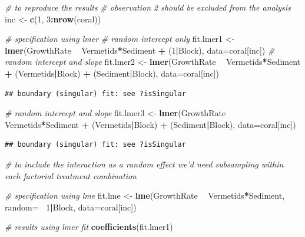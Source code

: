 \documentclass[]{book}
\newenvironment{Shaded}{\begin{snugshade}}{\end{snugshade}}
\newcommand{\KeywordTok}[1]{\textcolor[rgb]{0.13,0.29,0.53}{\textbf{#1}}}
\newcommand{\DataTypeTok}[1]{\textcolor[rgb]{0.13,0.29,0.53}{#1}}
\newcommand{\DecValTok}[1]{\textcolor[rgb]{0.00,0.00,0.81}{#1}}
\newcommand{\StringTok}[1]{\textcolor[rgb]{0.31,0.60,0.02}{#1}}
\newcommand{\CommentTok}[1]{\textcolor[rgb]{0.56,0.35,0.01}{\textit{#1}}}
\newcommand{\OperatorTok}[1]{\textcolor[rgb]{0.81,0.36,0.00}{\textbf{#1}}}
\newcommand{\NormalTok}[1]{#1}
\begin{document}
\begin{Shaded}
\begin{Highlighting}[]
\CommentTok{# to reproduce the results}
\CommentTok{# observation 2 should be excluded from the analysis}
\NormalTok{inc <-}\StringTok{ }\KeywordTok{c}\NormalTok{(}\DecValTok{1}\NormalTok{, }\DecValTok{3}\OperatorTok{:}\KeywordTok{nrow}\NormalTok{(coral))}

\CommentTok{# specification using lmer}
\CommentTok{# random intercept only}
\NormalTok{fit.lmer1 <-}\StringTok{ }\KeywordTok{lmer}\NormalTok{(GrowthRate }\OperatorTok{~}\StringTok{ }\NormalTok{Vermetids}\OperatorTok{*}\NormalTok{Sediment }\OperatorTok{+}\StringTok{ }\NormalTok{(}\DecValTok{1}\OperatorTok{|}\NormalTok{Block), }\DataTypeTok{data=}\NormalTok{coral[inc])}
\CommentTok{# random intercept and slope}
\NormalTok{fit.lmer2 <-}\StringTok{ }\KeywordTok{lmer}\NormalTok{(GrowthRate }\OperatorTok{~}\StringTok{ }\NormalTok{Vermetids}\OperatorTok{*}\NormalTok{Sediment }\OperatorTok{+}\StringTok{ }\NormalTok{(Vermetids}\OperatorTok{|}\NormalTok{Block) }\OperatorTok{+}\StringTok{ }\NormalTok{(Sediment}\OperatorTok{|}\NormalTok{Block), }\DataTypeTok{data=}\NormalTok{coral[inc])}
\end{Highlighting}
\end{Shaded}

\begin{verbatim}
## boundary (singular) fit: see ?isSingular
\end{verbatim}

\begin{Shaded}
\begin{Highlighting}[]
\CommentTok{# random intercept and slope}
\NormalTok{fit.lmer3 <-}\StringTok{ }\KeywordTok{lmer}\NormalTok{(GrowthRate }\OperatorTok{~}\StringTok{ }\NormalTok{Vermetids}\OperatorTok{*}\NormalTok{Sediment }\OperatorTok{+}\StringTok{ }\NormalTok{(Vermetids}\OperatorTok{|}\NormalTok{Block) }\OperatorTok{+}\StringTok{ }\NormalTok{(Sediment}\OperatorTok{|}\NormalTok{Block), }\DataTypeTok{data=}\NormalTok{coral[inc])}
\end{Highlighting}
\end{Shaded}

\begin{verbatim}
## boundary (singular) fit: see ?isSingular
\end{verbatim}

\begin{Shaded}
\begin{Highlighting}[]
\CommentTok{# to include the interaction as a random effect we'd need subsampling within each factorial treatment combination}

\CommentTok{# specification using lme}
\NormalTok{fit.lme <-}\StringTok{ }\KeywordTok{lme}\NormalTok{(GrowthRate }\OperatorTok{~}\StringTok{ }\NormalTok{Vermetids}\OperatorTok{*}\NormalTok{Sediment, }\DataTypeTok{random=} \OperatorTok{~}\DecValTok{1}\OperatorTok{|}\NormalTok{Block, }\DataTypeTok{data=}\NormalTok{coral[inc])}

\CommentTok{# results using lmer fit}
\KeywordTok{coefficients}\NormalTok{(fit.lmer1)}
\end{Highlighting}
\end{Shaded}
\end{document}
